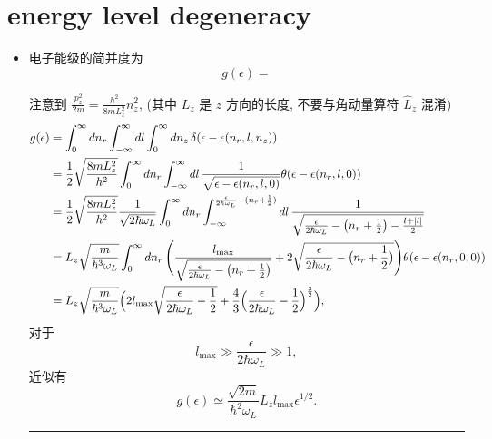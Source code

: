 \section{energy level degeneracy}
\begin{itemize}
	\item 电子能级的简并度为
	\begin{equation}
		g(\epsilon) = 
	\end{equation}
	
	\begin{tcolorbox}[title=caculation:]
		注意到 $\frac{p_z^2}{2 m} = \frac{h^2}{8 m L_z^2} n_z^2$, (其中 $L_z$ 是 $z$ 方向的长度, 不要与角动量算符 $\hat{L}_z$ 混淆)
		\begin{align}
			g(\epsilon) &= \int_0^\infty dn_r \int_{- \infty}^\infty dl \int_0^\infty dn_z \, \delta(\epsilon - \epsilon(n_r, l, n_z)) \notag \\
			&= \frac{1}{2} \sqrt{\frac{8 m L_z^2}{h^2}} \int_0^\infty dn_r \int_{- \infty}^\infty dl \, \frac{1}{\sqrt{\epsilon - \epsilon(n_r, l, 0)}} \theta(\epsilon - \epsilon(n_r, l, 0)) \notag \\
			&= \frac{1}{2} \sqrt{\frac{8 m L_z^2}{h^2}} \frac{1}{\sqrt{2 \hbar \omega_L}} \int_0^\infty dn_r \int_{- \infty}^{\frac{\epsilon}{2 \hbar \omega_L} - (n_r + \frac{1}{2})} dl \, \frac{1}{\sqrt{\frac{\epsilon}{2 \hbar \omega_L} - \big( n_r + \frac{1}{2} \big) - \frac{l + |l|}{2}}} \notag \\
			&= L_z \sqrt{\frac{m}{\hbar^3 \omega_L}} \int_0^\infty dn_r \, \Bigg( \frac{l_\text{max}}{\sqrt{\frac{\epsilon}{2 \hbar \omega_L} - \big( n_r + \frac{1}{2} \big)}} + 2 \sqrt{\frac{\epsilon}{2 \hbar \omega_L} - \big( n_r + \frac{1}{2} \big)} \Bigg) \theta(\epsilon - \epsilon(n_r, 0, 0)) \notag \\
			&= L_z \sqrt{\frac{m}{\hbar^3 \omega_L}} \Big( 2 l_\text{max} \sqrt{\frac{\epsilon}{2 \hbar \omega_L} - \frac{1}{2}} + \frac{4}{3} \Big( \frac{\epsilon}{2 \hbar \omega_L} - \frac{1}{2} \Big)^{\frac{3}{2}} \Big),
		\end{align}
		对于
		\begin{equation}
			l_\text{max} \gg \frac{\epsilon}{2 \hbar \omega_L} \gg 1,
		\end{equation}
		近似有
		\begin{equation}
			g(\epsilon) \simeq \frac{\sqrt{2 m}}{\hbar^2 \omega_L} L_z l_\text{max} \epsilon^{1 / 2}.
		\end{equation}
		
		\noindent\rule[0.5ex]{\linewidth}{0.5pt} %
		
		
	\end{tcolorbox}
\end{itemize}
